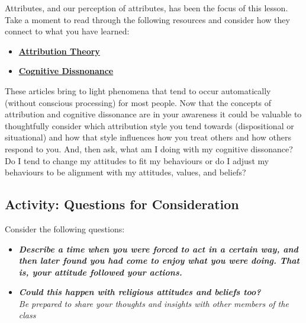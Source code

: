 \documentclass[
]{book}
\providecommand{\tightlist}{%
  \setlength{\itemsep}{0pt}\setlength{\parskip}{0pt}}
\begin{document}
\begin{reflect}
Attributes, and our perception of attributes, has been the focus of this lesson. Take a moment to read through the following resources and consider how they connect to what you have learned:

\begin{itemize}
\tightlist
\item
  \href{https://www.verywellmind.com/attribution-social-psychology-2795898}{\textbf{Attribution Theory}}\\
\item
  \href{https://www.simplypsychology.org/cognitive-dissonance.html}{\textbf{Cognitive Dissnonance}}
\end{itemize}

These articles bring to light phenomena that tend to occur automatically (without conscious processing) for most people. Now that the concepts of attribution and cognitive dissonance are in your awareness it could be valuable to thoughtfully consider which attribution style you tend towards (dispositional or situational) and how that style influences how you treat others and how others respond to you. And, then ask, what am I doing with my cognitive dissonance? Do I tend to change my attitudes to fit my behaviours or do I adjust my behaviours to be alignment with my attitudes, values, and beliefs?
\end{reflect}

\hypertarget{activity-questions-for-consideration-7}{%
\subsection*{Activity: Questions for Consideration}\label{activity-questions-for-consideration-7}}

\begin{reflect}
Consider the following questions:

\begin{itemize}
\tightlist
\item
  \textbf{\emph{Describe a time when you were forced to act in a certain way, and then later found you had come to enjoy what you were doing. That is, your attitude followed your actions.}}\\
\item
  \textbf{\emph{Could this happen with religious attitudes and beliefs too?}}\\
  \emph{Be prepared to share your thoughts and insights with other members of the class}
\end{itemize}
\end{reflect}
\end{document}
